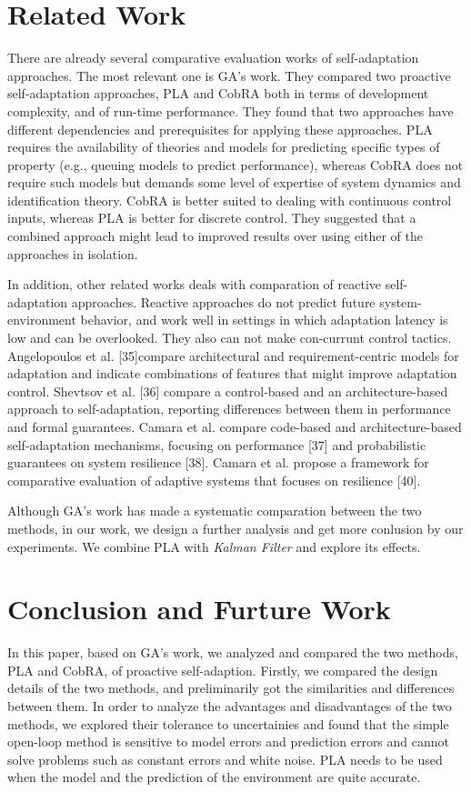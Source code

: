 \documentclass[sigconf]{acmart}
\begin{document}
\section{Related Work}
There are already several comparative evaluation works of self-adaptation approaches. The most relevant one is GA's work. They compared two proactive self-adaptation approaches, PLA and CobRA both in terms of development complexity, and of run-time performance. They found that two approaches have different dependencies and prerequisites for applying these approaches.
PLA requires the availability of theories and models for predicting specific types of property (e.g., queuing models to predict
performance), whereas CobRA does not require such models but demands some level of expertise of system dynamics and identification theory. CobRA is better suited to dealing with continuous control inputs, whereas PLA is better for discrete control. They suggested that a combined approach might lead to improved results over using either of the approaches in isolation.

In addition, other related works deals with comparation of reactive self-adaptation approaches. Reactive approaches do not  predict future system-environment behavior, and work well in settings in which adaptation latency is low and can be overlooked. They also can not make con-currunt control tactics. 
Angelopoulos et al. [35]compare architectural and requirement-centric models for adaptation and indicate combinations of features that might improve adaptation control. Shevtsov et al. [36] compare a control-based and an architecture-based approach to self-adaptation, reporting differences between them in performance and formal guarantees. Camara et al. compare code-based and architecture-based self-adaptation mechanisms, focusing on performance [37] and probabilistic guarantees on system resilience [38]. Camara et al. propose a framework for comparative evaluation of adaptive systems that focuses on resilience [40].

Although GA's work has made a systematic comparation between the two methods, in our work, we design a further analysis and get more conlusion by our experiments. We combine PLA with \textit{Kalman Filter} and explore its effects.
\section{Conclusion and Furture Work}

In this paper, based on GA's work, we analyzed and compared the two methods, PLA and CobRA, of proactive self-adaption. Firstly, we compared the design details of the two methods, and preliminarily got the similarities and differences between them.
In order to analyze the advantages and disadvantages of the two methods, we explored their tolerance to uncertainies and found that the simple open-loop method is sensitive to model errors and prediction errors and cannot solve problems such as constant errors and white noise.
PLA needs to be used when the model and the prediction of the environment are quite accurate.
\end{document}
